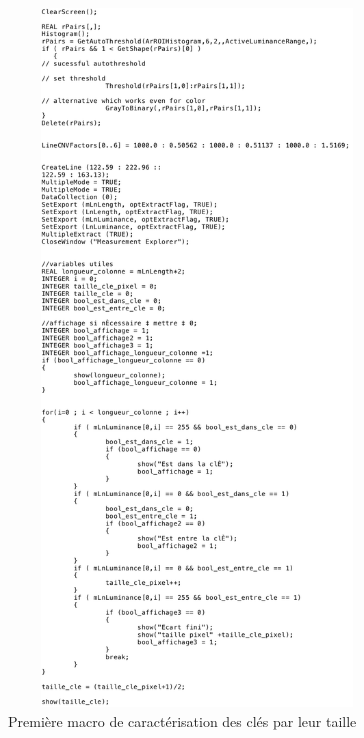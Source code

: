 \documentclass{scrreprt}
\begin{document}
\begin{figure}[!h]
\centering
\includegraphics[width=10cm, height=18.5cm]{images/second.png}
\caption{Première macro de caractérisation des clés par leur taille}
\end{figure}
\end{document}
